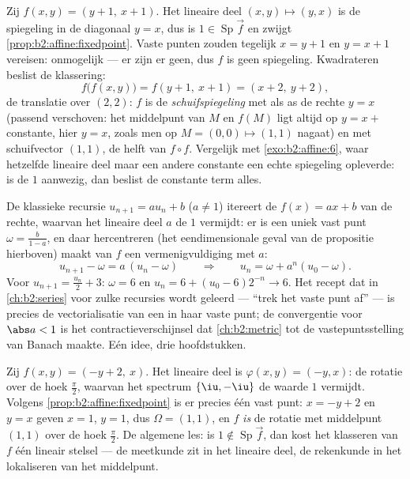 \begin{example}\label{ex:b2:affine:glide}
Zij $f(x, y) = (y + 1,\ x + 1)$. Het lineaire deel $(x, y) \mapsto
(y, x)$ is de spiegeling in de diagonaal $y = x$, dus is $1 \in
\operatorname{Sp}\vec f$ en zwijgt
\cref{prop:b2:affine:fixedpoint}. Vaste punten zouden tegelijk $x =
y + 1$ en $y = x + 1$ vereisen: onmogelijk --- er zijn er geen, dus
$f$ is geen spiegeling. Kwadrateren beslist de klassering:
\[
f\bigl(f(x, y)\bigr) = f(y + 1,\ x + 1) = (x + 2,\ y + 2),
\]
de translatie over $(2, 2)$: $f$ is de \emph{schuifspiegeling} met
als as de rechte $y = x$ (passend verschoven: het middelpunt van
$M$ en $f(M)$ ligt altijd op $y = x + {}$constante, hier $y = x$,
zoals men op $M = (0, 0) \mapsto (1,1)$ nagaat) en met
schuifvector $(1, 1)$, de helft van $f \circ f$. Vergelijk met
\cref{exo:b2:affine:6}, waar hetzelfde lineaire deel maar een
andere constante een echte spiegeling opleverde: is de 
$1$ aanwezig, dan beslist de constante term alles.
\end{example}

\begin{example}\label{ex:b2:affine:recursion}
De klassieke recursie $u_{n+1} = au_n + b$ ($a \neq 1$) itereert de
 $f(x) = ax + b$ van de rechte, waarvan het
lineaire deel $a$ de  $1$ vermijdt: er is een uniek vast
punt $\omega = \frac{b}{1-a}$, en daar hercentreren (het
eendimensionale geval van de propositie hierboven) maakt van $f$
een vermenigvuldiging met $a$:
\[
u_{n+1} - \omega = a\,(u_n - \omega)
\qquad\Longrightarrow\qquad
u_n = \omega + a^n(u_0 - \omega) .
\]
Voor $u_{n+1} = \frac{u_n}2 + 3$: $\omega = 6$ en $u_n = 6 + (u_0 -
6)2^{-n} \to 6$. Het recept dat in \cref{ch:b2:series} voor zulke
recursies wordt geleerd --- ``trek het vaste punt af'' --- is
precies de vectorialisatie van een  in haar vaste
punt; de convergentie voor $\abs a < 1$ is het
contractieverschijnsel dat \cref{ch:b2:metric} tot de
vastepuntsstelling van Banach maakte. Eén idee, drie hoofdstukken.
\end{example}

\begin{example}\label{ex:b2:affine:rotationcenter}
Zij $f(x, y) = (-y + 2,\ x)$. Het lineaire deel is $\varphi(x, y) =
(-y, x)$: de rotatie over de hoek $\frac\pi2$, waarvan het spectrum
$\{\iu, -\iu\}$ de waarde $1$ vermijdt. Volgens
\cref{prop:b2:affine:fixedpoint} is er precies één vast punt: $x =
-y + 2$ en $y = x$ geven $x = 1$, $y = 1$, dus $\Omega = (1, 1)$,
en $f$ \emph{is} de rotatie met middelpunt $(1, 1)$ over de hoek
$\frac\pi2$. De algemene les: is $1 \notin \operatorname{Sp}\vec
f$, dan kost het klasseren van $f$ één lineair stelsel --- de
meetkunde zit  in het lineaire deel, de rekenkunde 
in het lokaliseren van het middelpunt.
\end{example}

